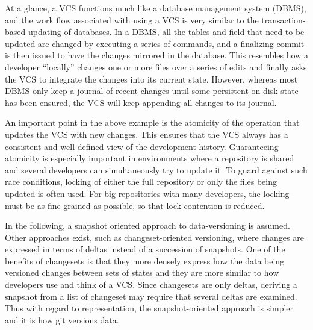 At a glance, a VCS functions much like a database management system
(DBMS), and the work flow associated with using a VCS is very
similar to the transaction-based updating of databases. In a DBMS, all
the tables and field that need to be updated are changed by executing
a series of commands, and a finalizing commit is then issued to have
the changes mirrored in the database. This resembles how a developer
``locally'' changes one or more files over a series of edits and
finally asks the VCS to integrate the changes into its current state.
However, whereas most DBMS only keep a journal of recent changes until
some persistent on-disk state has been ensured, the VCS will keep
appending all changes to its journal.

An important point in the above example is the atomicity of the
operation that updates the VCS with new changes. This ensures that the
VCS always has a consistent and well-defined view of the development
history. Guaranteeing atomicity is especially important in
environments where a repository is shared and several developers can
simultaneously try to update it. To guard against such race
conditions, locking of either the full repository or only the files being
updated is often used. For big repositories with many developers,
the locking must be as fine-grained as possible, so that lock contention
is reduced.


In the following, a snapshot oriented approach to data-versioning is
assumed. Other approaches exist, such as changeset-oriented
versioning, where changes are expressed in terms of deltas instead of
a succession of snapshots. One of the benefits of changesets is that
they more densely express how the data being versioned changes between
sets of states and they are more similar to how developers use and
think of a VCS. Since changesets are only deltas, deriving a snapshot
from a list of changeset may require that several deltas are examined.
Thus with regard to representation, the snapshot-oriented approach is
simpler and it is how git versions data.

% 
% 
% 

